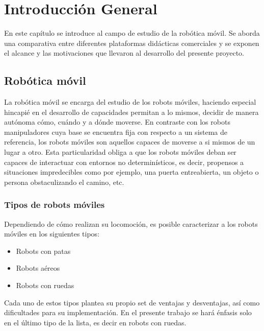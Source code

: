 \chapter{Introducción General}

\label{Capitulo1}

\newcommand{\keyword}[1]{\textbf{#1}}
\newcommand{\tabhead}[1]{\textbf{#1}}
\newcommand{\code}[1]{\texttt{#1}}
\newcommand{\file}[1]{\texttt{\bfseries#1}}
\newcommand{\option}[1]{\texttt{\itshape#1}}
\newcommand{\grados}{$^{\circ}$}

En este capítulo se introduce al campo de estudio de la robótica móvil. Se aborda una comparativa entre diferentes plataformas didácticas comerciales y se exponen el alcance y las motivaciones que llevaron al desarrollo del presente proyecto.

\section{Robótica móvil}

La robótica móvil se encarga del estudio de los robots móviles, haciendo especial hincapié en el desarrollo de capacidades permitan a lo mismos, decidir de manera autónoma cómo, cuándo y a dónde moverse.\newline
En contraste con los robots manipuladores cuya base se encuentra fija con respecto a un sistema de referencia, los robots móviles son aquellos capaces de moverse a si mismos de un lugar a otro. Esta particularidad obliga a que los robots móviles deban ser capaces de interactuar con entornos no determinísticos, es decir, propensos a situaciones impredecibles como por ejemplo, una puerta entreabierta, un objeto o persona obstaculizando el camino, etc.\newline

\subsection{Tipos de robots móviles}

Dependiendo de cómo realizan su locomoción, es posible caracterizar a los robots móviles en los siguientes tipos:
\begin{itemize}
	\item{Robots con patas}
	\item{Robots aéreos}
	\item{Robots con ruedas}
\end{itemize}

Cada uno de estos tipos plantea su propio set de ventajas y desventajas, así como dificultades para su implementación. En el presente trabajo se hará énfasis solo en el último tipo de la lista, es decir en robots con ruedas.

